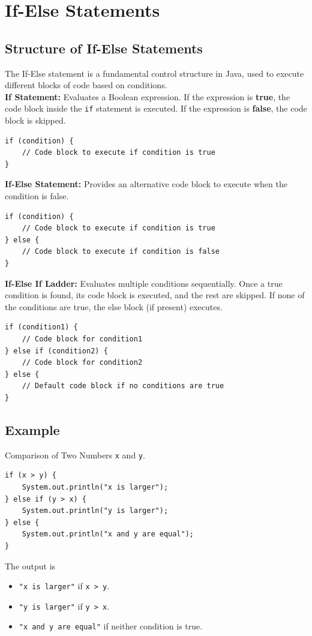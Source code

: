 \documentclass[letterpaper,12pt]{article}
\begin{document}
\section{If-Else Statements}
\subsection{Structure of If-Else Statements}
The If-Else statement is a fundamental control structure in Java, used to execute different blocks of code based on conditions.\\
\textbf{If Statement:} Evaluates a Boolean expression. If the expression is \textbf{true}, the code block inside the \texttt{if} statement is executed. If the expression is \textbf{false}, the code block is skipped.
\begin{verbatim}
if (condition) {
    // Code block to execute if condition is true
}
\end{verbatim}
\textbf{If-Else Statement:} Provides an alternative code block to execute when the condition is false.
\begin{verbatim}
if (condition) {
    // Code block to execute if condition is true
} else {
    // Code block to execute if condition is false
}
\end{verbatim}
\textbf{If-Else If Ladder:} Evaluates multiple conditions sequentially. Once a true condition is found, its code block is executed, and the rest are skipped. If none of the conditions are true, the else block (if present) executes.
\begin{verbatim}
if (condition1) {
    // Code block for condition1
} else if (condition2) {
    // Code block for condition2
} else {
    // Default code block if no conditions are true
}
\end{verbatim}
\subsection{Example}
Comparison of Two Numbers \texttt{x} and \texttt{y}.
\begin{verbatim}
if (x > y) {
    System.out.println("x is larger");
} else if (y > x) {
    System.out.println("y is larger");
} else {
    System.out.println("x and y are equal");
}
\end{verbatim}
The output is
\begin{itemize}
    \item \texttt{"x is larger"} if \texttt{x > y}.
    \item \texttt{"y is larger"} if \texttt{y > x}.
    \item \texttt{"x and y are equal"} if neither condition is true.
\end{itemize}
\end{document}
